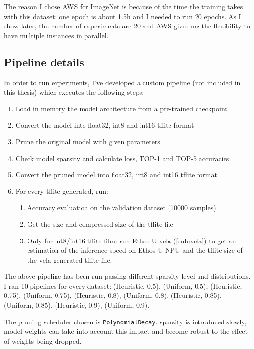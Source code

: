 The reason I chose AWS for ImageNet is because of the time the training takes
with this dataset: one epoch is about 1.5h and I needed to run 20 epochs.
As I show later, the number of experiments are 20 and AWS gives me the
flexibility to have multiple instances in parallel.

\subsection{Pipeline details}
In order to run experiments, I've developed a custom pipeline (not included in
this thesis) which executes the following steps:

\begin{enumerate}
    \item Load in memory the model architecture from a pre-trained checkpoint
    \item Convert the model into float32, int8 and int16 tflite format
    \item Prune the original model with given parameters
    \item Check model sparsity and calculate loss, TOP-1 and TOP-5 accuracies
    \item Convert the pruned model into float32, int8 and int16 tflite format
    \item For every tflite generated, run:
    \begin{enumerate}
        \item Accuracy evaluation on the validation dataset (10000 samples)
        \item Get the size and compressed size of the tflite file
        \item Only for int8/int16 tflite files: run Ethos-U vela
            (\autoref{sub:vela}) to get an estimation of the inference speed on
            Ethos-U NPU and the tflite size of the vela generated tflite file.
    \end{enumerate}
\end{enumerate}

The above pipeline has been run passing different sparsity level and
distributions. I ran 10 pipelines for every dataset: (Heuristic, 0.5),
(Uniform, 0.5), (Heuristic, 0.75), (Uniform, 0.75), (Heuristic, 0.8),
(Uniform, 0.8), (Heuristic, 0.85), (Uniform, 0.85), (Heuristic, 0.9),
(Uniform, 0.9).

The pruning scheduler chosen is \texttt{PolynomialDecay}: sparsity is
introduced slowly, model weights can take into account this impact and become
robust to the effect of weights being dropped.

